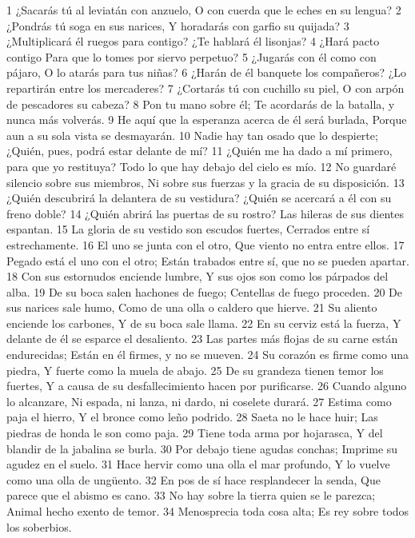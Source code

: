 1 ¿Sacarás tú al leviatán con anzuelo,
O con cuerda que le eches en su lengua?
2 ¿Pondrás tú soga en sus narices,
Y horadarás con garfio su quijada?
3 ¿Multiplicará él ruegos para contigo?
¿Te hablará él lisonjas?
4 ¿Hará pacto contigo
Para que lo tomes por siervo perpetuo?
5 ¿Jugarás con él como con pájaro,
O lo atarás para tus niñas?
6 ¿Harán de él banquete los compañeros?
¿Lo repartirán entre los mercaderes?
7 ¿Cortarás tú con cuchillo su piel,
O con arpón de pescadores su cabeza?
8 Pon tu mano sobre él;
Te acordarás de la batalla, y nunca más volverás.
9 He aquí que la esperanza acerca de él será burlada,
Porque aun a su sola vista se desmayarán.
10 Nadie hay tan osado que lo despierte;
¿Quién, pues, podrá estar delante de mí?
11 ¿Quién me ha dado a mí primero, para que yo restituya? 
Todo lo que hay debajo del cielo es mío.
12 No guardaré silencio sobre sus miembros,
Ni sobre sus fuerzas y la gracia de su disposición.
13 ¿Quién descubrirá la delantera de su vestidura?
¿Quién se acercará a él con su freno doble?
14 ¿Quién abrirá las puertas de su rostro?
Las hileras de sus dientes espantan.
15 La gloria de su vestido son escudos fuertes,
Cerrados entre sí estrechamente. 
16 El uno se junta con el otro,
Que viento no entra entre ellos.
17 Pegado está el uno con el otro;
Están trabados entre sí, que no se pueden apartar.
18 Con sus estornudos enciende lumbre,
Y sus ojos son como los párpados del alba.
19 De su boca salen hachones de fuego;
Centellas de fuego proceden.
20 De sus narices sale humo,
Como de una olla o caldero que hierve. 
21 Su aliento enciende los carbones,
Y de su boca sale llama.
22 En su cerviz está la fuerza,
Y delante de él se esparce el desaliento.
23 Las partes más flojas de su carne están endurecidas;
Están en él firmes, y no se mueven.
24 Su corazón es firme como una piedra,
Y fuerte como la muela de abajo.
25 De su grandeza tienen temor los fuertes,
Y a causa de su desfallecimiento hacen por purificarse. 
26 Cuando alguno lo alcanzare,
Ni espada, ni lanza, ni dardo, ni coselete durará.
27 Estima como paja el hierro,
Y el bronce como leño podrido.
28 Saeta no le hace huir;
Las piedras de honda le son como paja.
29 Tiene toda arma por hojarasca,
Y del blandir de la jabalina se burla.
30 Por debajo tiene agudas conchas;
Imprime su agudez en el suelo.
31 Hace hervir como una olla el mar profundo,
Y lo vuelve como una olla de ungüento.
32 En pos de sí hace resplandecer la senda, 
Que parece que el abismo es cano.
33 No hay sobre la tierra quien se le parezca;
Animal hecho exento de temor.
34 Menosprecia toda cosa alta;
Es rey sobre todos los soberbios.

